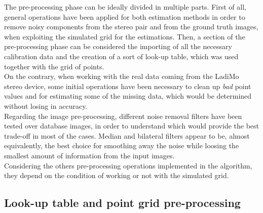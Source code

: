 The pre-processing phase can be ideally divided in multiple parts.
First of all, general operations have been applied for both estimation methods in order to remove noisy components from the stereo pair and from the ground truth images, when exploiting the simulated grid for the estimations.
Then, a section of the pre-processing phase can be considered the importing of all the necessary calibration data and the creation of a sort of look-up table, which was used together with the grid of points.\\
On the contrary, when working with the real data coming from the LadiMo stereo device, some initial operations have been necessary to clean up \textit{bad} point values and for estimating some of the missing data, which would be determined without losing in accuracy. \\
Regarding the image pre-processing, different noise removal filters have been tested over database images, in order to understand which would provide the best trade-off in most of the cases. 
Median and bilateral filters appear to be, almost equivalently, the best choice for smoothing away the noise while loosing the smallest amount of information from the input images. \\
Considering the others pre-processing operations implemented in the algorithm, they depend on the condition of working or not with the simulated grid.

\subsection{Look-up table and point grid pre-processing}
\label{subsection:grid-preprocessing}

